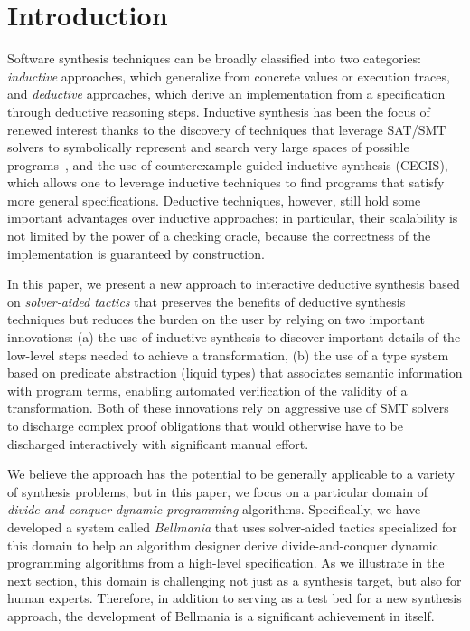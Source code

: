 \section{Introduction}
\label{intro}


\newcommand{\xidx}{i}
\newcommand{\yidx}{j}
\newcommand{\xw}[1]{w^x_{#1}}
\newcommand{\yw}[1]{w^y_{#1}}

Software synthesis techniques can be broadly classified into two categories: \emph{inductive} approaches, which generalize from concrete values or execution traces, and \emph{deductive} approaches, which derive an implementation from a specification through deductive reasoning steps. Inductive synthesis has been the focus of renewed interest thanks to the discovery of techniques that leverage SAT/SMT solvers to symbolically represent and search very large spaces of possible programs~\cite{APLAS09/Solar-Lezama, PLDI11/Gulwani, Onward13/Torlak}, and the use of counterexample-guided inductive synthesis (CEGIS), which allows one to leverage inductive techniques to find programs that satisfy more general specifications. Deductive techniques, however, still hold some important advantages over inductive approaches; in particular, their scalability is not limited by the power of a checking oracle, because the correctness of the implementation is guaranteed by construction.

In this paper, we present a new approach to interactive deductive synthesis based on \emph{solver-aided tactics} that preserves the benefits of deductive synthesis techniques but reduces the burden on the user by relying on two important innovations: (a) the use of inductive synthesis to discover important details of the low-level steps needed to achieve a transformation, (b) the use of a type system based on predicate abstraction (liquid types) that associates semantic information with program terms, enabling automated verification of the validity of a transformation. Both of these innovations rely on aggressive use of SMT solvers to discharge complex proof obligations that would otherwise have to be discharged interactively with significant manual effort. 

We believe the approach has the potential to be generally applicable to a variety of synthesis problems, but in this paper, we focus on a particular domain of \emph{divide-and-conquer dynamic programming} algorithms. Specifically, we have developed a system called \emph{Bellmania} that uses solver-aided tactics specialized for this domain to help an algorithm designer derive divide-and-conquer dynamic programming algorithms from a high-level specification. As we illustrate in the next section, this domain is challenging not just as a synthesis target, but also for human experts. Therefore, in addition to serving as a test bed for a new synthesis approach, the development of Bellmania is a significant achievement in itself.

